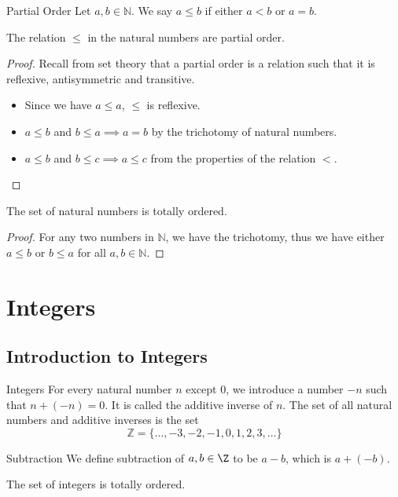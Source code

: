 \begin{defn}{Partial Order}{} Let $a,b\in\mathbb{N}$. We say $a\leq b$ if either $a<b$ or $a=b$. 
\end{defn}

\begin{thm}{}{} The relation $\leq$ in the natural numbers are partial order. 
\end{thm}
\begin{proof} Recall from set theory that a partial order is a relation such that it is reflexive, antisymmetric and transitive. 
\begin{itemize}
\item Since we have $a\leq a$, $\leq$ is reflexive. 
\item $a\leq b$ and $b\leq a\implies a=b$ by the trichotomy of natural numbers. 
\item $a\leq b$ and $b\leq c\implies a\leq c$ from the properties of the relation $<$. 
\end{itemize}
\end{proof}

\begin{thm}{}{} The set of natural numbers is totally ordered. 
\end{thm}
\begin{proof} For any two numbers in $\mathbb{N}$, we have the trichotomy, thus we have either $a\leq b$ or $b\leq a$ for all $a,b\in\mathbb{N}$. 
\end{proof}

\pagebreak
\section{Integers}
\subsection{Introduction to Integers}
\begin{defn}{Integers}{} For every natural number $n$ except $0$, we introduce a number $-n$ such that $n+(-n)=0$. It is called the additive inverse of $n$. The set of all natural numbers and additive inverses is the set $$\mathbb{Z}=\{\dots,-3,-2,-1,0,1,2,3,\dots\}$$
\end{defn}

\begin{defn}{Subtraction}{} We define subtraction of $a,b\in\Z$ to be $a-b$, which is $a+(-b)$. 
\end{defn}

\begin{prp}{}{} The set of integers is totally ordered. 
\end{prp}

